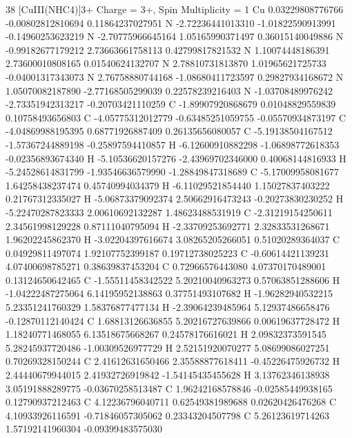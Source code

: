 38 
[CuIII(NHC4)]3+ 
Charge = 3+, Spin Multiplicity = 1 
  Cu  0.03229808776766     -0.00802812810694      0.11864237027951 
  N   -2.72236441013310     -1.01822590913991     -0.14960253623219 
  N   -2.70775966645164      1.05165990371497      0.36015140049886 
  N   -0.99182677179212      2.73663661758113      0.42799817821532 
  N   1.10074448186391      2.73600010808165      0.01540624132707 
  N   2.78810731813870      1.01965621725733     -0.04001317343073 
  N   2.76758880744168     -1.08680411723597      0.29827934168672 
  N   1.05070082187890     -2.77168505299039      0.22578239216403 
  N   -1.03708489976242     -2.73351942313217     -0.20703421110259 
  C   -1.89907920868679      0.01048829559839      0.10758493656803 
  C   -4.05775312012779     -0.63485251059755     -0.05570934873197 
  C   -4.04869988195395      0.68771926887409      0.26135656080057 
  C   -5.19138504167512     -1.57367244889198     -0.25897594410857 
  H   -6.12600910882298     -1.06898772618353     -0.02356893674340 
  H   -5.10536620157276     -2.43969702346000      0.40068144816933 
  H   -5.24528614831799     -1.93546636579990     -1.28849847318689 
  C   -5.17009958081677      1.64258438237474      0.45740994034379 
  H   -6.11029521854440      1.15027837403222      0.21767312335027 
  H   -5.06873379092374      2.50662916473243     -0.20273830230252 
  H   -5.22470287823333      2.00610692132287      1.48623488531919 
  C   -2.31219154250611      2.34561998129228      0.87111040795094 
  H   -2.33709253692771      2.32833531268671      1.96202245862370 
  H   -3.02204397616674      3.08265205266051      0.51020289364037 
  C   0.04929811497074      1.92107752399187      0.19712738025223 
  C   -0.60614421139231      4.07400698785271      0.38639837453204 
  C   0.72966576443080      4.07370170489001      0.13124650642465 
  C   -1.55511458342522      5.20210040963273      0.57063851288606 
  H   -1.04222487275064      6.14195952138863      0.37751493107682 
  H   -1.96282940532215      5.23351241760329      1.58376877477134 
  H   -2.39064239485964      5.12937486658476     -0.12870112140424 
  C   1.68813126636855      5.20216727639866      0.00619637728472 
  H   1.18240771468055      6.13518675668267      0.24578176616021 
  H   2.09832373591545      5.28245937720486     -1.00309526977729 
  H   2.52151920070277      5.08699086027251      0.70269328150244 
  C   2.41612631650466      2.35588877618411     -0.45226475926732 
  H   2.44440679944015      2.41932726919842     -1.54145435455628 
  H   3.13762346138938      3.05191888289775     -0.03670258513487 
  C   1.96242168578846     -0.02585449938165      0.12790937212463 
  C   4.12236796040711      0.62549381989688      0.02620426476268 
  C   4.10933926116591     -0.71846057305062      0.23343204507798 
  C   5.26123619714263      1.57192141960304     -0.09399483575030 


